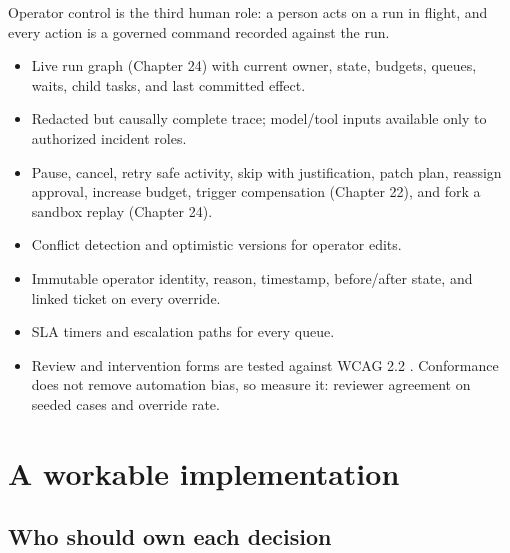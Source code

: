 Operator control is the third human role: a person acts on a run in flight, and every action is a governed command recorded against the run.\par

\begin{itemize}

\item Live run graph (Chapter 24) with current owner, state, budgets, queues, waits, child tasks, and last committed effect.

\item Redacted but causally complete trace; model/tool inputs available only to authorized incident roles.

\item Pause, cancel, retry safe activity, skip with justification, patch plan, reassign approval, increase budget, trigger compensation (Chapter 22), and fork a sandbox replay (Chapter 24).

\item Conflict detection and optimistic versions for operator edits.

\item Immutable operator identity, reason, timestamp, before/after state, and linked ticket on every override.

\item SLA timers and escalation paths for every queue.

\item Review and intervention forms are tested against WCAG 2.2 . Conformance does not remove automation bias, so measure it: reviewer agreement on seeded cases and override rate.

\end{itemize}

\section{A workable implementation}

\subsection{Who should own each decision}

